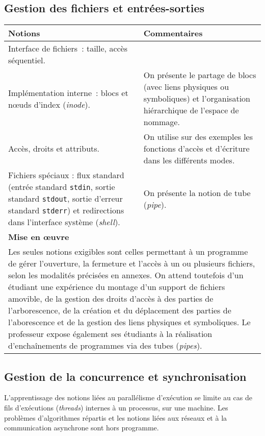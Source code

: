 \subsection{Gestion des fichiers et entrées-sorties \semUn}


\noindent
\begin{longtable}{|p{\lnotion}|p{\comment}|}
  \hline
  \textbf{Notions} & \textbf{Commentaires}\\
  \hline \hline
  Interface de fichiers~: taille, accès séquentiel.
  &
  \\
  \hline
  Implémentation interne~: blocs et n\oe uds d'index (\textit{inode}).
  &
  On présente le partage de blocs (avec liens physiques ou symboliques)
    et l'organisation hiérarchique de l'espace de nommage.
  \\
  \hline
  Accès, droits et attributs.
  &
On utilise sur des exemples les fonctions d'accès et d'écriture dans les différents modes.
  \\
  \hline
  Fichiers spéciaux : flux standard (entrée standard \texttt{stdin}, sortie standard \texttt{stdout}, sortie d'erreur standard \texttt{stderr}) et
  redirections dans l'interface système (\textit{shell}).
  &
On présente la notion de tube (\textit{pipe}).
  \\

  \hline\hline
  \multicolumn{2}{|p{\lmoe}|}{\textbf{Mise en \oe uvre}} \\
  \hline
  \multicolumn{2}{|p{\lmoe}|}{
Les seules notions exigibles sont celles permettant à un programme de gérer
l'ouverture, la fermeture et l'accès à un ou plusieurs fichiers, selon les modalités précisées en annexes. 
On attend toutefois d'un étudiant une expérience
du montage d'un support de fichiers amovible, 
de la gestion des droits d'accès à des parties de l'arborescence, 
de la création et du déplacement des parties de l'aborescence 
et de la gestion des liens physiques et symboliques. 
Le professeur expose également ses étudiants à la réalisation d'enchaînements de programmes via des tubes (\textit{pipes}).
  } \\
  \hline
\end{longtable}

\clearpage

\subsection{Gestion de la concurrence et synchronisation \semTroisQuatre}

L'apprentissage des notions liées au parallélisme d'exécution se limite au cas
de fils d'exécutions (\textit{threads}) internes à un processus, sur une machine. Les
problèmes d'algorithmes répartis et les notions liées aux réseaux et à la
communication asynchrone sont hors programme.

